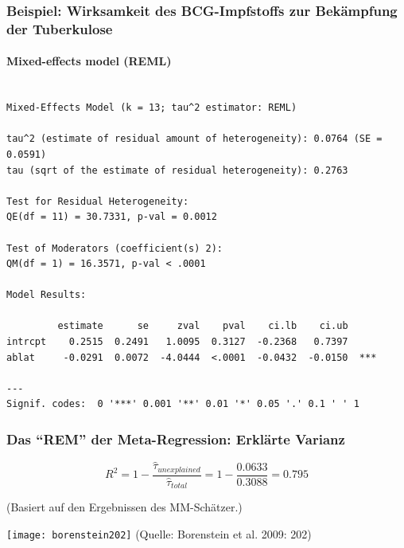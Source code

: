 \begin{frame}[fragile]
  \frametitle{Beispiel: Wirksamkeit des BCG-Impfstoffs zur Bekämpfung der Tuberkulose}
  \framesubtitle{Mixed-effects model (REML)}

\begin{tiny}
\begin{knitrout}
\color{fgcolor}\begin{kframe}
\begin{verbatim}

Mixed-Effects Model (k = 13; tau^2 estimator: REML)

tau^2 (estimate of residual amount of heterogeneity): 0.0764 (SE = 0.0591)
tau (sqrt of the estimate of residual heterogeneity): 0.2763

Test for Residual Heterogeneity: 
QE(df = 11) = 30.7331, p-val = 0.0012

Test of Moderators (coefficient(s) 2): 
QM(df = 1) = 16.3571, p-val < .0001

Model Results:

         estimate      se     zval    pval    ci.lb    ci.ub     
intrcpt    0.2515  0.2491   1.0095  0.3127  -0.2368   0.7397     
ablat     -0.0291  0.0072  -4.0444  <.0001  -0.0432  -0.0150  ***

---
Signif. codes:  0 '***' 0.001 '**' 0.01 '*' 0.05 '.' 0.1 ' ' 1 
\end{verbatim}
\end{kframe}
\end{knitrout}

\end{tiny}
\end{frame}


\begin{frame}[shrink = 5]
  \frametitle{Das "`REM"' der Meta-Regression: Erklärte Varianz}

  \begin{equation}
    R^2 = 1-\frac{\widehat{\tau}_{unexplained}}{\widehat{\tau}_{total}} =
    1-\frac{0.0633}{0.3088} =
    0.795
  \end{equation}

  (Basiert auf den Ergebnissen des MM-Schätzer.)

  \texttt{[image: borenstein202]}
\newline(Quelle: Borenstein et al. 2009: 202)

\end{frame}




